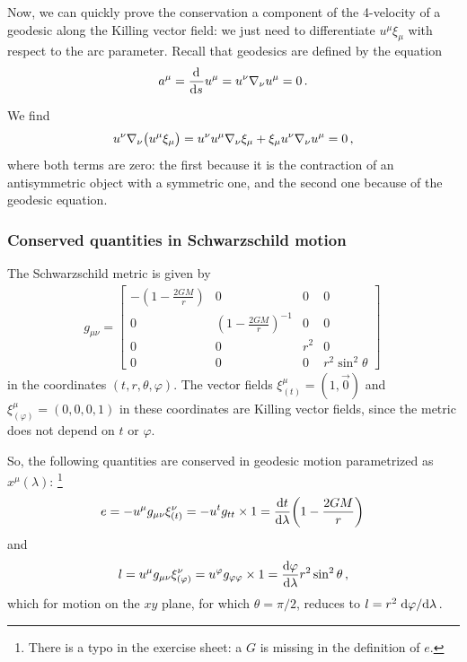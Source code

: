 \documentclass[main.tex]{subfiles}
\begin{document}
Now, we can quickly prove the conservation a component of the 4-velocity of a geodesic along the Killing vector field: we just need to differentiate \(u^{\mu } \xi_{\mu }\) with respect to the arc parameter. 
Recall that geodesics are defined by the equation 
%
\begin{align}
 a^{\mu } =  \dv[]{}{s} u^{\mu } = u^{\nu } \nabla_{\nu } u^{\mu } = 0 
\,.
\end{align}
%

We find 
%
\begin{align}
  u^{\nu }\nabla_{\nu }\qty(u^{\mu } \xi_{\mu })
  = u^{\nu } u^{\mu } \nabla_{\nu } \xi_{\mu } + \xi_{\mu } u^{\nu } \nabla_{\nu } u^{\mu } = 0
\,,
\end{align}
%
where both terms are zero: the first because it is the contraction of an antisymmetric object with a symmetric one, and the second one because of the geodesic equation. 

\subsubsection{Conserved quantities in Schwarzschild motion}

The Schwarzschild metric is given by 
%
\begin{align}
  g_{\mu \nu } = \left[\begin{array}{cccc}
  -(1-\frac{2GM}{r}) & 0 & 0 & 0 \\ 
  0 & (1-\frac{2GM}{r})^{-1} & 0 & 0 \\ 
  0 & 0 & r^2 & 0 \\ 
  0 & 0 & 0 & r^2 \sin^2\theta 
  \end{array}\right]
\,
\end{align}
%
in the coordinates \((t, r, \theta , \varphi )\). The vector fields \(\xi_{(t)}^{\mu } = (1, \vec{0})\) and \(\xi_{(\varphi )}^{\mu } = (0,0,0,1)\) in these coordinates are Killing vector fields, since the metric does not depend on \(t\) or \(\varphi \). 

So, the following quantities are conserved in geodesic motion parametrized as \(x^{\mu }(\lambda )\): \footnote{There is a typo in the exercise sheet: a \(G\) is missing in the definition of \(e\).}
%
\begin{align}
  e = -u^{\mu } g_{\mu \nu } \xi^{\nu }_{(t)}
  = -u^{t} g_{tt } \times 1
  = \dv{t}{\lambda } \qty(1 - \frac{2GM}{r})
\,
\end{align}
%
and 
%
\begin{align}
  l = u^{\mu } g_{\mu \nu } \xi^{\nu }_{(\varphi )}
  = u^{\varphi } g_{\varphi \varphi } \times 1
  = \dv{\varphi }{\lambda } r^2 \sin^2\theta 
\,,
\end{align}
%
which for motion on the \(xy\) plane, for which \(\theta = \pi /2\), reduces to \(l = r^2 \dv*{\varphi }{\lambda }\).
\end{document}
